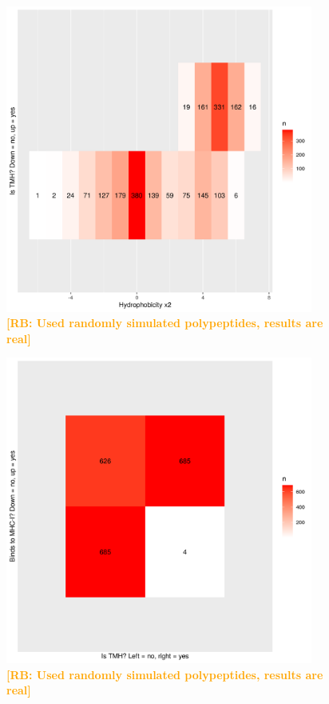 \documentclass{article}
\newcommand{\richel}[1]{\textcolor{orange}{\textbf{[RB: #1]}}}
\begin{document}
\begin{figure}[!htbp]
  \includegraphics[width=0.9\textwidth]{p_bind_per_hydrophobicity/hydrophobicity_vs_is_tmh.png}
  \caption{
    \richel{Used randomly simulated polypeptides, results are real}
  }
  \label{fig:hydrophobicity_vs_is_tmh}
\end{figure}

\begin{figure}[!htbp]
  \includegraphics[width=0.9\textwidth]{p_bind_per_hydrophobicity/is_tmh_vs_binds_mhc1.png}
  \caption{
    \richel{Used randomly simulated polypeptides, results are real}
  }
  \label{fig:is_tmh_vs_binds_mhc1}
\end{figure}
\end{document}
